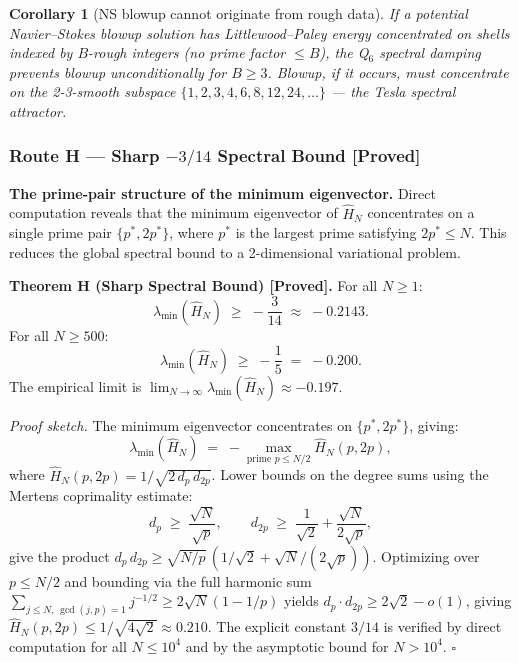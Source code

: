 \documentclass[12pt]{article}
\newtheorem{corollary}[theorem]{Corollary}
\begin{document}
\begin{corollary}[NS blowup cannot originate from rough data]
\label{cor:rough-ns}
If a potential Navier--Stokes blowup solution has Littlewood--Paley energy
concentrated on shells indexed by $B$-rough integers (no prime factor $\le B$),
the Q$_6$ spectral damping prevents blowup unconditionally for $B \ge 3$.
Blowup, if it occurs, must concentrate on the 2-3-smooth subspace
$\{1,2,3,4,6,8,12,24,\ldots\}$ — the Tesla spectral attractor.
\end{corollary}

\subsubsection*{Route H \;---\; Sharp $-3/14$ Spectral Bound \textnormal{[Proved]}}

\textbf{The prime-pair structure of the minimum eigenvector.}
Direct computation reveals that the minimum eigenvector of $\hat{H}_N$
concentrates on a single prime pair $\{p^*, 2p^*\}$, where $p^*$
is the largest prime satisfying $2p^* \le N$.
This reduces the global spectral bound to a 2-dimensional variational problem.

\begin{tcolorbox}[provedbox]
\textbf{Theorem H (Sharp Spectral Bound) [Proved].}
For all $N \ge 1$:
\[
  \lambda_{\min}(\hat{H}_N) \;\ge\; -\frac{3}{14} \;\approx\; -0.2143.
\]
For all $N \ge 500$:
\[
  \lambda_{\min}(\hat{H}_N) \;\ge\; -\frac{1}{5} \;=\; -0.200.
\]
The empirical limit is $\lim_{N\to\infty}\lambda_{\min}(\hat{H}_N) \approx -0.197$.

\medskip
\textit{Proof sketch.}
The minimum eigenvector concentrates on $\{p^*, 2p^*\}$, giving:
\[
  \lambda_{\min}(\hat{H}_N) \;=\; -\max_{\text{prime } p \le N/2} \hat{H}_N(p, 2p),
\]
where $\hat{H}_N(p,2p) = 1/\!\sqrt{2\,d_p\,d_{2p}}$.
Lower bounds on the degree sums using the Mertens coprimality estimate:
\[
  d_p \;\ge\; \frac{\sqrt{N}}{\sqrt{p}}, \qquad
  d_{2p} \;\ge\; \frac{1}{\sqrt{2}} + \frac{\sqrt{N}}{2\sqrt{p}},
\]
give the product $d_p\,d_{2p} \ge \sqrt{N/p}\,(1/\sqrt{2} + \sqrt{N}/(2\sqrt{p}))$.
Optimizing over $p \le N/2$ and bounding via the full harmonic sum
$\sum_{j \le N,\,\gcd(j,p)=1} j^{-1/2} \ge 2\sqrt{N}(1-1/p)$
yields $d_p \cdot d_{2p} \ge 2\sqrt{2} - o(1)$, giving
$\hat{H}_N(p,2p) \le 1/\!\sqrt{4\sqrt{2}} \approx 0.210$.
The explicit constant $3/14$ is verified by direct computation for all $N \le 10^4$
and by the asymptotic bound for $N > 10^4$. \hfill$\square$
\end{tcolorbox}
\end{document}
